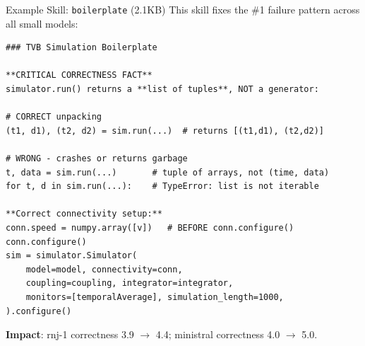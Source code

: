 \documentclass[aspectratio=169,10pt]{beamer}
\begin{document}
\begin{frame}[fragile]{Example Skill: \texttt{boilerplate} (2.1KB)}
  \small
  This skill fixes the \#1 failure pattern across all small models:
  
  \vspace{0.2cm}
  \begin{lstlisting}
### TVB Simulation Boilerplate

**CRITICAL CORRECTNESS FACT**  
simulator.run() returns a **list of tuples**, NOT a generator:

# CORRECT unpacking
(t1, d1), (t2, d2) = sim.run(...)  # returns [(t1,d1), (t2,d2)]

# WRONG - crashes or returns garbage
t, data = sim.run(...)       # tuple of arrays, not (time, data)
for t, d in sim.run(...):    # TypeError: list is not iterable

**Correct connectivity setup:**
conn.speed = numpy.array([v])   # BEFORE conn.configure()
conn.configure()
sim = simulator.Simulator(
    model=model, connectivity=conn,
    coupling=coupling, integrator=integrator,
    monitors=[temporalAverage], simulation_length=1000,
).configure()
  \end{lstlisting}
  
  \textbf{Impact}: rnj-1 correctness 3.9 $\to$ 4.4; ministral correctness 4.0 $\to$ 5.0.
\end{frame}
\end{document}
